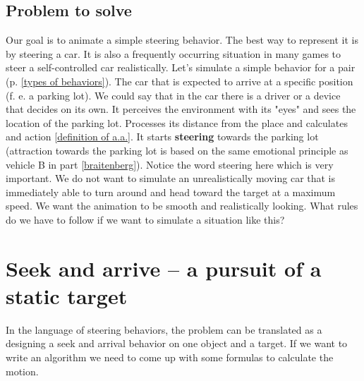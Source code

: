 \documentclass[10pt,twoside,english,a4paper]{article}
\begin{document}
\subsection{Problem to solve} \label{problem to solve}

Our goal is to animate a simple steering behavior. The best way to represent
it is by steering a car. It is also a frequently occurring situation 
in many games to steer a self-controlled car realistically.
Let’s simulate a simple behavior for a pair 
(p. \ref{types of behaviors}). The car that 
is expected to arrive at a specific position (f. e. a parking lot). 
We could say that in the car there is a driver or a device that decides on its own.
It perceives the environment with its "eyes" and sees the location of the parking 
lot. Processes its distance from the place and calculates and action \ref{definition of a.a.}. 
It starts \textbf{steering} towards the parking lot (attraction towards the 
parking lot is based on the same emotional principle as vehicle B in part \ref{braitenberg}). 
Notice the word steering here which is very important. We do not want 
to simulate an unrealistically moving car that is immediately able to 
turn around and head toward the target at a maximum speed. We want the 
animation to be smooth and realistically looking. What rules do we 
have to follow if we want to simulate a situation like this?

\section{Seek and arrive – a pursuit of a static target} \label{seek and arrive}

In the language of steering behaviors, the problem can be translated as 
a designing a seek and arrival behavior on one object and a target. 
If we want to write an algorithm we need to come up with some 
formulas to calculate the motion.
\end{document}
